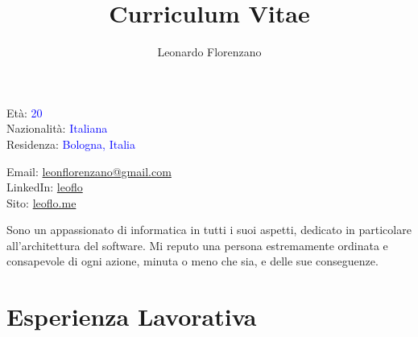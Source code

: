 \documentclass{paper}
\title{Curriculum Vitae}
\author{Leonardo Florenzano}
\begin{document}
\maketitle

\begin{multicols}{2}

\noindent
Età: \textcolor{blue}{20}\\
Nazionalità: \textcolor{blue}{Italiana}\\
Residenza: \textcolor{blue}{Bologna, Italia}

\columnbreak

\noindent
Email: \href{mailto:leonflorenzano@gmail.com}{leonflorenzano@gmail.com}\\
LinkedIn: \href{https://www.linkedin.com/in/leoflo}{leoflo}\\
Sito: \href{https://leoflo.me}{leoflo.me}

\end{multicols}

\noindent
Sono un appassionato di informatica in tutti i suoi aspetti, dedicato in particolare all'architettura del software.
Mi reputo una persona estremamente ordinata e consapevole di ogni azione, minuta o meno che sia, e delle sue conseguenze.

\section{Esperienza Lavorativa}
\end{document}
